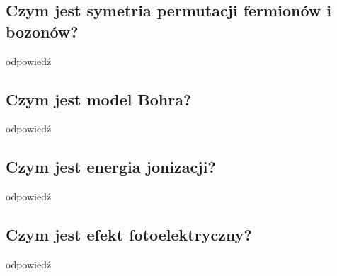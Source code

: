 \subsection{Czym jest symetria permutacji fermionów i bozonów?}

odpowiedź

\subsection{Czym jest model Bohra?}

odpowiedź

\subsection{Czym jest energia jonizacji?}

odpowiedź

\subsection{Czym jest efekt fotoelektryczny?}

odpowiedź
